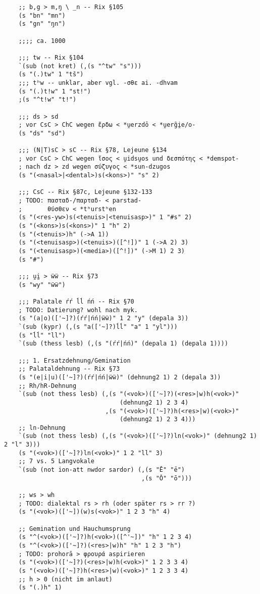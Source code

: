 \begin{verbatim}
    ;; b,g > m,ŋ \ _n -- Rix §105
    (s "bn" "mn")
    (s "gn" "ŋn")

    ;;;; ca. 1000

    ;;; tw -- Rix §104
    `(sub (not kret) (,(s "^tw" "s")))
    (s "(.)tw" 1 "tš")
    ;;; tʰw -- unklar, aber vgl. -σθε ai. -dhvam
    (s "(.)t!w" 1 "st!")
    ;(s "^t!w" "t!")

    ;;; ds > sd
    ; vor CsC > ChC wegen ἔρδω < *u̯erzdō < *u̯erg̑i̯e/o-
    (s "ds" "sd")

    ;;; (N|T)sC > sC -- Rix §78, Lejeune §134
    ; vor CsC > ChC wegen ἴσος < u̯idsu̯os und δεσπότης < *demspot-
    ; nach dz > zd wegen σύζυγος < *sun-dzugos
    (s "(<nasal>|<dental>)s(<kons>)" "s" 2)

    ;;; CsC -- Rix §87c, Lejeune §132-133
    ; TODO: πασταδ-/παρταδ- < parstad-
    ;       θύσθεν < *tʰurstʰen
    (s "(<res-yw>)s(<tenuis>|<tenuisasp>)" 1 "#s" 2)
    (s "(<kons>)s(<kons>)" 1 "h" 2)
    (s "(<tenuis>)h" (->A 1))
    (s "(<tenuisasp>)(<tenuis>)([^!])" 1 (->A 2) 3)
    (s "(<tenuisasp>)(<media>)([^!])" (->M 1) 2 3)
    (s "#")

    ;;; u̯i̯ > ẅẅ -- Rix §73
    (s "wy" "ẅẅ")

    ;;; Palatale ŕŕ ĺĺ ńń -- Rix §70
    ; TODO: Datierung? wohl nach myk.
    (s "(a|o)(['~]?)(ŕŕ|ńń|ẅẅ)" 1 2 "y" (depala 3))
    `(sub (kypr) (,(s "a(['~]?)ĺĺ" "a" 1 "yl")))
    (s "ĺĺ" "ll")
    `(sub (thess lesb) (,(s "(ŕŕ|ńń)" (depala 1) (depala 1))))

    ;;; 1. Ersatzdehnung/Gemination
    ;; Palataldehnung -- Rix §73
    (s "(e|i|u)(['~]?)(ŕŕ|ńń|ẅẅ)" (dehnung2 1) 2 (depala 3))
    ;; Rh/hR-Dehnung
    `(sub (not thess lesb) (,(s "(<vok>)(['~]?)(<res>|w)h(<vok>)"
                                (dehnung2 1) 2 3 4)
                            ,(s "(<vok>)(['~]?)h(<res>|w)(<vok>)"
                                (dehnung2 1) 2 3 4)))
    ;; ln-Dehnung
    `(sub (not thess lesb) (,(s "(<vok>)(['~]?)ln(<vok>)" (dehnung2 1) 2 "l" 3)))
    (s "(<vok>)(['~]?)ln(<vok>)" 1 2 "ll" 3)
    ;; 7 vs. 5 Langvokale
    `(sub (not ion-att nwdor sardor) (,(s "Ē" "ē")
                                      ,(s "Ō" "ō")))

    ;; ws > wh
    ; TODO: dialektal rs > rh (oder später rs > rr ?)
    (s "(<vok>)(['~])(w)s(<vok>)" 1 2 3 "h" 4)

    ;; Gemination und Hauchumsprung
    (s "^(<vok>)(['~]?)h(<vok>)([^'~])" "h" 1 2 3 4)
    (s "^(<vok>)(['~]?)(<res>|w)h" "h" 1 2 3 "h")
    ; TODO: prohorā > φρουρά aspirieren
    (s "(<vok>)(['~]?)(<res>|w)h(<vok>)" 1 2 3 3 4)
    (s "(<vok>)(['~]?)h(<res>|w)(<vok>)" 1 2 3 3 4)
    ;; h > 0 (nicht im anlaut)
    (s "(.)h" 1)


\end{verbatim}
